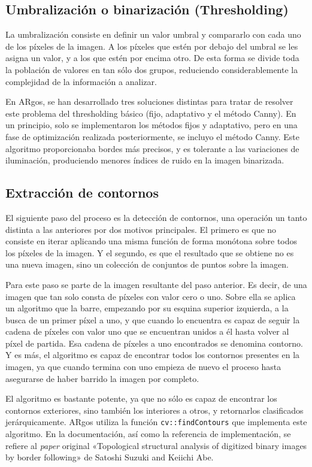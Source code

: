 \subsection{Umbralización o binarización (Thresholding)}
La umbralización consiste en definir un valor umbral y compararlo con cada uno de los píxeles de la
imagen. A los píxeles que estén por debajo del umbral se les asigna un valor, y a los que estén por
encima otro. De esta forma se divide toda la población de valores en tan sólo dos grupos, reduciendo
considerablemente la complejidad de la información a analizar.

En ARgos, se han desarrollado tres soluciones distintas para tratar de resolver este problema del
thresholding básico (fijo, adaptativo y el método Canny). En un principio, solo se implementaron
los métodos fijos y adaptativo, pero en una fase de optimización realizada posteriormente, se incluyo
el método Canny. Este algoritmo proporcionaba bordes más precisos, y es  tolerante a las
variaciones de iluminación, produciendo menores índices de ruido en la imagen binarizada.

\subsection{Extracción de contornos}
El siguiente paso del proceso es la detección de contornos, una operación un tanto distinta a las
anteriores por dos motivos principales. El primero es que no consiste en iterar aplicando una misma
función de forma monótona sobre todos los píxeles de la imagen. Y el segundo, es que el resultado que
se obtiene no es una nueva imagen, sino un colección de conjuntos de puntos sobre la imagen.

Para este paso se parte de la imagen resultante del paso anterior. Es decir, de una imagen que tan
solo consta de píxeles con valor cero o uno. Sobre ella se aplica un algoritmo que la barre,
empezando por su esquina superior izquierda, a la busca de un primer píxel a uno, y que cuando lo
encuentra es capaz de seguir la cadena de píxeles con valor uno que se encuentran unidos a él hasta
volver al píxel de partida. Esa cadena de píxeles a uno encontrados se denomina contorno. Y es más,
el algoritmo es capaz de encontrar todos los contornos presentes en la imagen, ya que cuando termina
con uno empieza de nuevo el proceso hasta asegurarse de haber barrido la imagen por completo.

El algoritmo es bastante potente, ya que no sólo es capaz de encontrar los contornos exteriores,
sino también los interiores a otros, y retornarlos clasificados jerárquicamente. ARgos utiliza la
función \texttt{cv::findContours} que implementa este algoritmo. En la documentación, así como la
referencia de implementación, se refiere al \textit{paper} original «Topological structural analysis
of digitized binary images by border following» de Satoshi Suzuki and Keiichi Abe.

